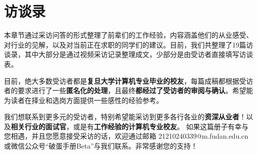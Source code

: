 \chapter{访谈录}
本章节通过采访问答的形式整理了前辈们的工作经验，内容涵盖他们的从业感受、对行业的见解，以及对当前正在求职的同学们的建议。目前，我们共整理了19篇访谈录，其中大部分是通过视频采访记录整理成文，少部分是由受访者直接填写访谈表。

目前，绝大多数受访者都是\textbf{复旦大学计算机专业毕业的校友}，每篇成稿都根据受访者的要求进行了一些\textbf{匿名化的处理}，且最终\textbf{都经过了受访者的审阅与确认}。希望能为读者在择业和选岗方面提供一些感性的经验参考。


我们想联系到更多元的受访者，特别希望能采访到更多各行各业的\textbf{资深从业者}！以及\textbf{相关行业的面试官}，或是有\textbf{工作经验的计算机专业校友}。
如果这篇册子有幸与您相遇，并且您愿意接受采访的话，欢迎通过邮箱 21210240339@m.fudan.edu.cn 或微信公众号“破蛋手册Beta”与我们联系。非常感谢您的支持！



